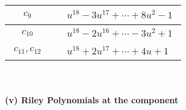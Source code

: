 \documentclass[1p]{elsarticle_modified}
\theoremstyle{definition}
\begin{document}
\begin{tabular}{m{50pt}|m{274pt}}
\hline $$\begin{aligned}c_{9}\end{aligned}$$&$\begin{aligned}
&u^{18}-3 u^{17}+\cdots+8 u^2-1
\end{aligned}$\\
\hline $$\begin{aligned}c_{10}\end{aligned}$$&$\begin{aligned}
&u^{18}-2 u^{16}+\cdots-3 u^2+1
\end{aligned}$\\
\hline $$\begin{aligned}c_{11},c_{12}\end{aligned}$$&$\begin{aligned}
&u^{18}+2 u^{17}+\cdots+4 u+1
\end{aligned}$\\
\hline
\end{tabular}\\~\\
\newpage\renewcommand{\arraystretch}{1}
\flushleft \textbf{(v) Riley Polynomials at the component}\newline \\
\end{document}
